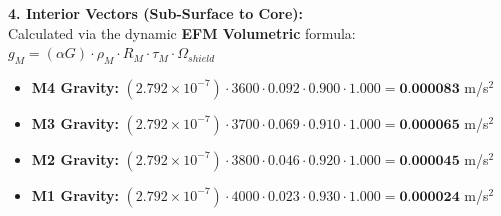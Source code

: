 \documentclass[11pt, a4paper]{article}
\begin{document}
  \vspace{0.5em}
  \noindent \textbf{4. Interior Vectors (Sub-Surface to Core):} \\[0.5em]
  \hspace*{1em} Calculated via the dynamic \textbf{EFM Volumetric} formula: $g_M = (\alpha G) \cdot \rho_{M} \cdot R_M \cdot \tau_M \cdot \Omega_{shield}$
  \begin{itemize}
    \item \textbf{M4 Gravity:} $(2.792 \times 10^{-7}) \cdot 3600 \cdot 0.092 \cdot 0.900 \cdot 1.000 = \textbf{0.000083}$ m/s$^2$
    \item \textbf{M3 Gravity:} $(2.792 \times 10^{-7}) \cdot 3700 \cdot 0.069 \cdot 0.910 \cdot 1.000 = \textbf{0.000065}$ m/s$^2$
    \item \textbf{M2 Gravity:} $(2.792 \times 10^{-7}) \cdot 3800 \cdot 0.046 \cdot 0.920 \cdot 1.000 = \textbf{0.000045}$ m/s$^2$
    \item \textbf{M1 Gravity:} $(2.792 \times 10^{-7}) \cdot 4000 \cdot 0.023 \cdot 0.930 \cdot 1.000 = \textbf{0.000024}$ m/s$^2$
  \end{itemize}
\end{document}
